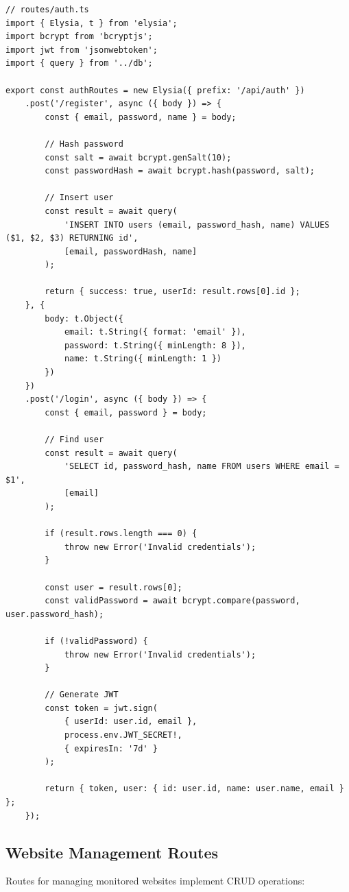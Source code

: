 \begin{verbatim}
// routes/auth.ts
import { Elysia, t } from 'elysia';
import bcrypt from 'bcryptjs';
import jwt from 'jsonwebtoken';
import { query } from '../db';

export const authRoutes = new Elysia({ prefix: '/api/auth' })
    .post('/register', async ({ body }) => {
        const { email, password, name } = body;
        
        // Hash password
        const salt = await bcrypt.genSalt(10);
        const passwordHash = await bcrypt.hash(password, salt);
        
        // Insert user
        const result = await query(
            'INSERT INTO users (email, password_hash, name) VALUES ($1, $2, $3) RETURNING id',
            [email, passwordHash, name]
        );
        
        return { success: true, userId: result.rows[0].id };
    }, {
        body: t.Object({
            email: t.String({ format: 'email' }),
            password: t.String({ minLength: 8 }),
            name: t.String({ minLength: 1 })
        })
    })
    .post('/login', async ({ body }) => {
        const { email, password } = body;
        
        // Find user
        const result = await query(
            'SELECT id, password_hash, name FROM users WHERE email = $1',
            [email]
        );
        
        if (result.rows.length === 0) {
            throw new Error('Invalid credentials');
        }
        
        const user = result.rows[0];
        const validPassword = await bcrypt.compare(password, user.password_hash);
        
        if (!validPassword) {
            throw new Error('Invalid credentials');
        }
        
        // Generate JWT
        const token = jwt.sign(
            { userId: user.id, email },
            process.env.JWT_SECRET!,
            { expiresIn: '7d' }
        );
        
        return { token, user: { id: user.id, name: user.name, email } };
    });
\end{verbatim}

\subsection{Website Management Routes}

Routes for managing monitored websites implement CRUD operations:

